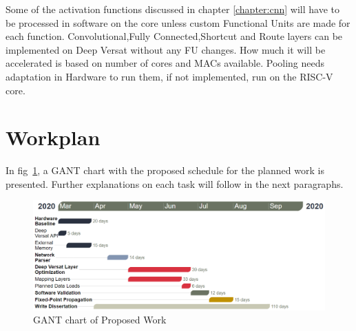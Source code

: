 Some of the activation functions discussed in chapter \ref{chapter:cnn}
will have to be processed in software on the core unless custom Functional Units
are made for each function. Convolutional,Fully Connected,Shortcut and Route
layers can be implemented on Deep Versat without any FU changes. How much it
will be accelerated is based on number of cores and MACs available. Pooling
needs adaptation in Hardware to run them, if not implemented, run on the RISC-V
core.

\section{Workplan}

In fig~\ref{figure:gant}, a GANT chart with the proposed schedule for the
planned work is presented. Further explanations on each task will follow in the
next paragraphs.

\begin{figure}[!htbp]
    \includegraphics[width=1\textwidth]{Figures/gant2.png}
    \caption{GANT chart of Proposed Work}
    \label{figure:gant}
\end{figure}





